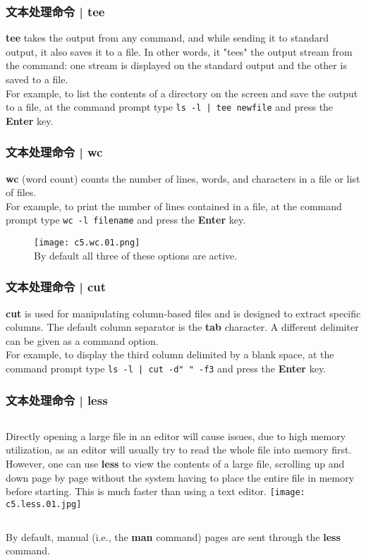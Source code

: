\begin{frame}[fragile]
  \frametitle{文本处理命令 | tee}
  \textbf{tee} takes the output from any command, and while sending it to standard output, it also saves it to a file. In other words, it "tees" the output stream from the command: one stream is displayed on the standard output and the other is saved to a file.\\
  \vspace{0.3cm}
  For example, to list the contents of a directory on the screen and save the output to a file, at the command prompt type \verb=ls -l | tee newfile= and press the \textbf{Enter} key.
\end{frame}

\begin{frame}[fragile]
  \frametitle{文本处理命令 | wc}
  \textbf{wc} (word count) counts the number of lines, words, and characters in a file or list of files.\\
  \vspace{0.3cm}
  For example, to print the number of lines contained in a file, at the command prompt type \verb|wc -l filename| and press the \textbf{Enter} key.
  \begin{figure}
    \centering
    \texttt{[image: c5.wc.01.png]}\\
  By default all three of these options are active.
  \end{figure}
\end{frame}

\begin{frame}[fragile]
  \frametitle{文本处理命令 | cut}
  \textbf{cut} is used for manipulating column-based files and is designed to extract specific columns. The default column separator is the \textbf{tab} character. A different delimiter can be given as a command option.\\
  \vspace{0.3cm}
  For example, to display the third column delimited by a blank space, at the command prompt type \verb=ls -l | cut -d" " -f3= and press the \textbf{Enter} key.
\end{frame}

\begin{frame}
  \frametitle{文本处理命令 | less}
  \begin{columns}
  Directly opening a large file in an editor will cause issues, due to high memory utilization, as an editor will usually try to read the whole file into memory first. However, one can use \textbf{less} to view the contents of a large file, scrolling up and down page by page without the system having to place the entire file in memory before starting. This is much faster than using a text editor.
    \texttt{[image: c5.less.01.jpg]}
  \end{columns}
  By default, manual (i.e., the \textbf{man} command) pages are sent through the \textbf{less} command.
\end{frame}

